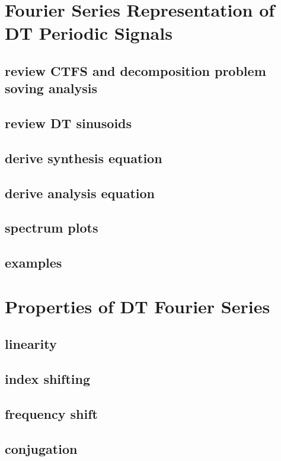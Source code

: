 \documentclass{article}
\begin{document}
\newpage
\section{Fourier Series Representation of DT Periodic Signals}
\label{sec:org562e005}
\subsection{review CTFS and decomposition problem soving analysis}
\label{sec:org707998e}
\subsection{review DT sinusoids}
\label{sec:org5d5a23f}
\subsection{derive synthesis equation}
\label{sec:orgf946aaa}
\subsection{derive analysis equation}
\label{sec:orgf89f55d}
\subsection{spectrum plots}
\label{sec:org4f1a797}
\subsection{examples}
\label{sec:org95c7e81}

\newpage
\section{Properties of DT Fourier Series}
\label{sec:org7340971}
\subsection{linearity}
\label{sec:orga5b5f77}
\subsection{index shifting}
\label{sec:org1c757d9}
\subsection{frequency shift}
\label{sec:org4fedcd7}
\subsection{conjugation}
\label{sec:org9ab6428}
\end{document}
